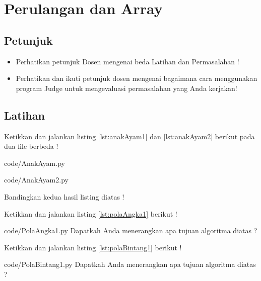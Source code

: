\chapter{Perulangan dan Array}

\section{Petunjuk}
\begin{itemize}
	\item Perhatikan petunjuk Dosen mengenai beda Latihan dan Permasalahan !
	\
	\item Perhatikan dan ikuti petunjuk dosen mengenai bagaimana cara menggunakan program Judge untuk mengevaluasi permasalahan yang Anda kerjakan!
\end{itemize}

\section{Latihan}


\begin{latihan}
Ketikkan dan jalankan listing \ref{lst:anakAyam1} dan \ref{lst:anakAyam2} berikut pada dua file berbeda ! 
									
 							  {code/AnakAyam.py}



									
 							  {code/AnakAyam2.py}
								
Bandingkan kedua hasil listing diatas ! 
\end{latihan}

\begin{latihan}
Ketikkan dan jalankan listing \ref{lst:polaAngka1}  berikut  ! 
									
 							  {code/PolaAngka1.py}
Dapatkah Anda menerangkan apa tujuan algoritma diatas ?  
\end{latihan}


\begin{latihan}
Ketikkan dan jalankan listing \ref{lst:polaBintang1}  berikut  ! 
									
 							  {code/PolaBintang1.py}
Dapatkah Anda menerangkan apa tujuan algoritma diatas ?  



\end{latihan}



